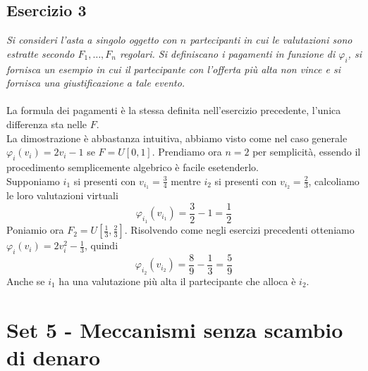 \documentclass{article}
\begin{document}
        \subsection{Esercizio 3}
            \textit{Si consideri l'asta a singolo oggetto con $ n $ partecipanti in cui le valutazioni sono estratte secondo $ F_1, \dots, F_n $ regolari. Si definiscano i pagamenti in funzione di $ \varphi_i $, si fornisca un esempio in cui il partecipante con l'offerta più alta non vince e si fornisca una giustificazione a tale evento.}\\
            \\
            La formula dei pagamenti è la stessa definita nell'esercizio precedente, l'unica differenza sta nelle $ F $.\\
            La dimostrazione è abbastanza intuitiva, abbiamo visto come nel caso generale $ \varphi_i(v_i) = 2v_i - 1 $ se $ F = U[0,1] $. Prendiamo ora $ n = 2 $ per semplicità, essendo il procedimento semplicemente algebrico è facile esetenderlo.\\
            Supponiamo $ i_1 $ si presenti con $ v_{i_1} = \frac{3}{4} $ mentre $ i_2 $ si presenti con $ v_{i_2} = \frac{2}{3} $, calcoliamo le loro valutazioni virtuali
            \[
                \varphi_{i_1}(v_{i_1}) = \frac{3}{2} - 1 = \frac{1}{2} 
            \]
            Poniamio ora $ F_2 = U[\frac{1}{3}, \frac{2}{3}] $. Risolvendo come negli esercizi precedenti otteniamo $ \varphi_i(v_i) = 2v_i^2 - \frac{1}{3} $, quindi
            \[
                \varphi_{i_2}(v_{i_2}) = \frac{8}{9} - \frac{1}{3} = \frac{5}{9}      
            \]
            Anche se $ i_1 $ ha una valutazione più alta il partecipante che alloca è $ i_2 $.
    \newpage
    \section{Set 5 - Meccanismi senza scambio di denaro}
\end{document}
